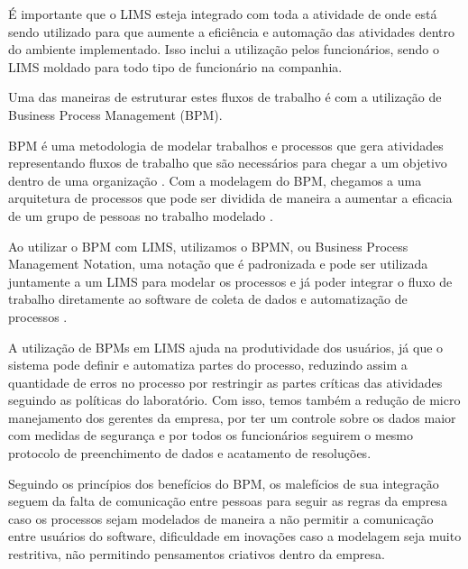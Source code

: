 
É importante que o LIMS esteja integrado com toda a atividade de onde está sendo utilizado para que aumente a eficiência e automação das atividades dentro do ambiente implementado. Isso inclui a utilização pelos funcionários, sendo o LIMS moldado para todo tipo de funcionário na companhia.

Uma das maneiras de estruturar estes fluxos de trabalho é com a utilização de Business Process Management (BPM).

BPM é uma metodologia de modelar trabalhos e processos que gera atividades representando fluxos de trabalho que são necessários para chegar a um objetivo dentro de uma organização \R. Com a modelagem do BPM, chegamos a uma arquitetura de processos que pode ser dividida de maneira a aumentar a eficacia de um grupo de pessoas no trabalho modelado \R.


Ao utilizar o BPM com LIMS, utilizamos o BPMN, ou Business Process Management Notation, uma notação que é padronizada \R e pode ser utilizada juntamente a um LIMS para modelar os processos e já poder integrar o fluxo de trabalho diretamente ao software de coleta de dados e automatização de processos \R.




A utilização de BPMs em LIMS ajuda na produtividade dos usuários, já que o sistema pode definir e automatiza partes do processo, reduzindo assim a quantidade de erros no processo por restringir as partes críticas das atividades seguindo as políticas do laboratório.
Com isso, temos também a redução de micro manejamento dos gerentes da empresa, por ter um controle sobre os dados maior com medidas de segurança e por todos os funcionários seguirem o mesmo protocolo de preenchimento de dados e acatamento de resoluções. \R 


Seguindo os princípios dos benefícios do BPM, os malefícios de sua integração seguem da falta de comunicação entre pessoas para seguir as regras da empresa caso os processos sejam modelados de maneira a não permitir a comunicação entre usuários do software, dificuldade em inovações caso a modelagem seja muito restritiva, não permitindo pensamentos criativos dentro da empresa.

